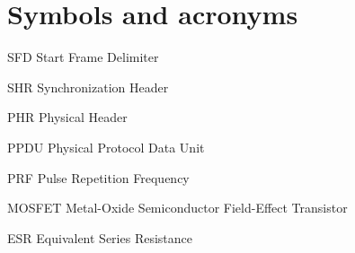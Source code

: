 \documentclass[\main/main.tex]{subfiles}
\begin{document}
\chapter*{Symbols and acronyms}
\begin{abbrv}
    \item[SFD]  Start Frame Delimiter
    \item[SHR]  Synchronization Header
    \item[PHR]  Physical Header
    \item[PPDU] Physical Protocol Data Unit
    \item[PRF]  Pulse Repetition Frequency
    \item[MOSFET]  Metal-Oxide Semiconductor Field-Effect Transistor
    \item[ESR]  Equivalent Series Resistance
\end{abbrv}
\end{document}
